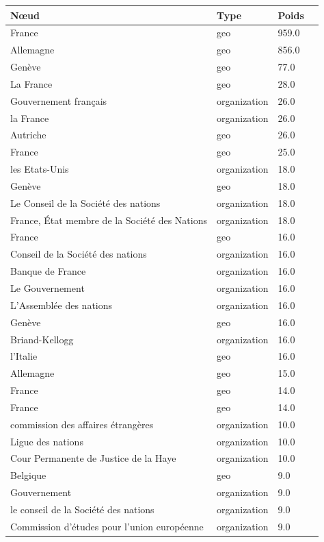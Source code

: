 \documentclass[a4paper,twoside,12pt]{book}
\begin{document}
\begin{table}[htbp]
\centering
\begin{tabular}{ll@{\hskip 1cm}ll}
\hline
\textbf{Nœud} & \textbf{Type} & \textbf{Poids} \\
\hline
France & geo & 959.0 \\
Allemagne & geo & 856.0 \\
Genève & geo & 77.0 \\
La France & geo & 28.0 \\
Gouvernement français & organization & 26.0 \\
la France & organization & 26.0 \\
Autriche & geo & 26.0 \\
France & geo & 25.0 \\
les Etats-Unis & organization & 18.0 \\
Genève & geo & 18.0 \\
Le Conseil de la Société des nations & organization & 18.0 \\
France, État membre de la Société des Nations & organization & 18.0 \\
France & geo & 16.0 \\
Conseil de la Société des nations & organization & 16.0 \\
Banque de France & organization & 16.0 \\
Le Gouvernement & organization & 16.0 \\
L'Assemblée des nations & organization & 16.0 \\
Genève  & geo & 16.0 \\
Briand-Kellogg & organization & 16.0 \\
l'Italie & geo & 16.0 \\
Allemagne & geo & 15.0 \\
France & geo & 14.0 \\
France  & geo & 14.0 \\
commission des affaires étrangères & organization & 10.0 \\
Ligue des nations & organization & 10.0 \\
Cour Permanente de Justice de la Haye & organization & 10.0 \\
Belgique & geo & 9.0 \\
Gouvernement & organization & 9.0 \\
le conseil de la Société des nations & organization & 9.0 \\
Commission d'études pour l'union européenne & organization & 9.0 \\

\end{tabular}
\end{table}
\end{document}
